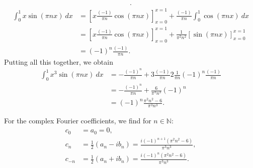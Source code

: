 \documentclass[11pt]{article}
\begin{document}
\begin{solution}
\begin{align*}
        .
    \end{align*}
    \begin{align*}
        \int_{0}^1 x \sin(\pi n x) \ dx
        &
        =
        \left[ x \tfrac{(-1)}{\pi n} \cos(\pi n x)\right]_{x=0}^{x=1}
        +
        \tfrac{(-1)}{\pi n}
        \int_{0}^1 \cos(\pi n x) \ dx
        \\& 
        =
        \left[ x \tfrac{(-1)}{\pi n} \cos(\pi n x)\right]_{x=0}^{x=1}
        +
        \tfrac{1}{\pi^{2} n^{2}}
        \left[ \sin(\pi n x)\right]_{x=0}^{x=1}
        \\& 
        =
        (-1)^{n}
        \tfrac{(-1)}{\pi n}
        .
    \end{align*}
    Putting all this together, we obtain 
    \begin{align*}
        \int_{0}^1 x^3 \sin(\pi n x) \ dx
        &
        =
        - \tfrac{(-1)^{n}}{\pi n} 
        + 
        3 \tfrac{(-1)}{\pi n} 
        2 \tfrac{1}{\pi n} 
        (-1)^{n}
        \tfrac{(-1)}{\pi n}
        \\&
        =
        - \frac{(-1)^{n}}{\pi n} 
        + 
        \frac{6}{\pi^{3} n^{3}} 
        (-1)^{n}
        \\&
        =
        (-1)^{n}
        \frac{ \pi^{2} n^{2} - 6 }{ \pi^{3} n^{3} }
        .
    \end{align*}


    For the complex Fourier coefficients, we find for $n \in \mathbb{N}$:
    \begin{align*}
        c_0 &= a_0 = 0,
        \\
        c_n &= \frac 1 2 (a_n - i b_n) = \frac{i (-1)^{n+1} (\pi^2 n^2 - 6)}{\pi^3 n^3},
        \\
        c_{-n} &= \frac 1 2 (a_n + i b_n) = \frac{i(-1)^n(\pi^2 n^2 - 6)}{\pi^3 n^3}.
    \end{align*}
    
\end{solution}
\end{document}
